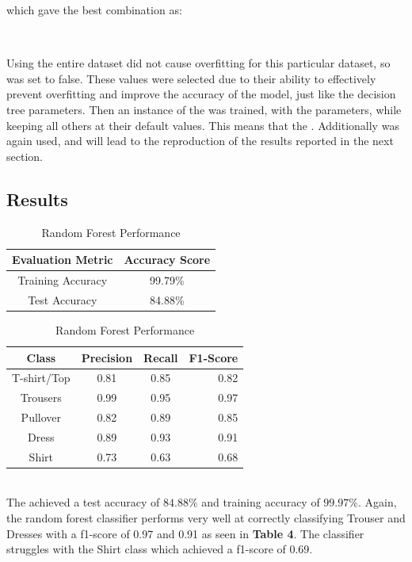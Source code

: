 which gave the best combination as:\\

\begin{tcolorbox}[colback=white,
                  arc=0pt,
                outer=0pt]
\centering {} \, \,  \, \,  \, \, \\
   \end{tcolorbox}


Using the entire dataset did not cause overfitting for this particular dataset, so  was set to false.
These values were selected due to their ability to effectively prevent overfitting and improve the accuracy of the model, just like the decision tree parameters.
Then an instance of the  was trained, with the parameters, while keeping all others at their default values. This means that the .
Additionally  was again used, and will lead to the reproduction of the results reported in the next section.

\subsection{Results}\label{subsec:results}
\begin{table}[!ht]
\begin{subtable}[c]{0.4\textwidth}
\footnotesize
\centering
\begin{tabular}{ c | c }
 \toprule
 Evaluation Metric & Accuracy Score  \\
 \midrule
 Training Accuracy &  99.79\% \\
 Test Accuracy & 84.88\% \\
 \bottomrule
\end{tabular}
\captionsetup{justification=centering,margin=1cm}
\end{subtable}
\begin{subtable}[c]{0.6\textwidth}
\footnotesize
\centering
\begin{tabular}{c | c c r}
Class & Precision & Recall & F1-Score\\
\midrule
T-shirt/Top   &    0.81  &    0.85  &    0.82 \\
Trousers   &    0.99  &    0.95  &    0.97 \\
Pullover   &    0.82  &    0.89  &    0.85\\
Dress   &    0.89  &    0.93  &    0.91\\
Shirt   &    0.73  &    0.63  &    0.68\\
\end{tabular}
\captionsetup{justification=centering,margin=1cm}
\end{subtable}
\caption{Random Forest Performance}
\label{tab:random_forest_evaluation}
\end{table}\\

The  achieved a test accuracy of $84.88\%$ and training accuracy of $99.97\%$.
Again, the random forest classifier performs very well at correctly classifying Trouser and Dresses with a f1-score of 0.97 and 0.91 as seen in \textbf{Table 4}.
The classifier struggles with the Shirt class which achieved a f1-score of 0.69.
